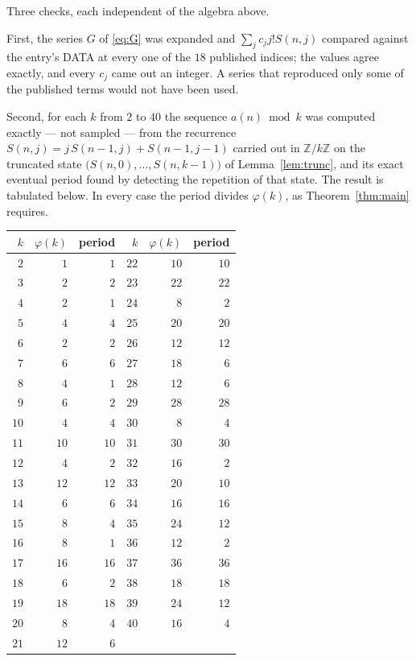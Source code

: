 \documentclass[11pt,a4paper]{article}
\theoremstyle{plain}
\theoremstyle{definition}
\begin{document}
Three checks, each independent of the algebra above.

First, the series $G$ of \eqref{eq:G} was expanded and $\sum_j c_j j! S(n,j)$ compared
against the entry's DATA at every one of the $18$ published indices; the values
agree exactly, and every $c_j$ came out an integer. A series that reproduced only some of
the published terms would not have been used.

Second, for each $k$ from $2$ to $40$ the sequence $a(n)\bmod k$ was computed exactly
--- not sampled --- from the recurrence $S(n,j)=j\,S(n-1,j)+S(n-1,j-1)$ carried out in
$\mathbb{Z}/k\mathbb{Z}$ on the truncated state
$\bigl(S(n,0),\dots,S(n,k-1)\bigr)$ of Lemma~\ref{lem:trunc}, and its exact eventual
period found by detecting the repetition of that state. The result is tabulated below.
In every case the period divides $\varphi(k)$, as Theorem~\ref{thm:main} requires.

\begin{center}\small
\begin{tabular}{rrr@{\qquad\qquad}rrr}
$k$ & $\varphi(k)$ & period & $k$ & $\varphi(k)$ & period \\ \hline
$2$ & $1$ & $1$ & $22$ & $10$ & $10$ \\
$3$ & $2$ & $2$ & $23$ & $22$ & $22$ \\
$4$ & $2$ & $1$ & $24$ & $8$ & $2$ \\
$5$ & $4$ & $4$ & $25$ & $20$ & $20$ \\
$6$ & $2$ & $2$ & $26$ & $12$ & $12$ \\
$7$ & $6$ & $6$ & $27$ & $18$ & $6$ \\
$8$ & $4$ & $1$ & $28$ & $12$ & $6$ \\
$9$ & $6$ & $2$ & $29$ & $28$ & $28$ \\
$10$ & $4$ & $4$ & $30$ & $8$ & $4$ \\
$11$ & $10$ & $10$ & $31$ & $30$ & $30$ \\
$12$ & $4$ & $2$ & $32$ & $16$ & $2$ \\
$13$ & $12$ & $12$ & $33$ & $20$ & $10$ \\
$14$ & $6$ & $6$ & $34$ & $16$ & $16$ \\
$15$ & $8$ & $4$ & $35$ & $24$ & $12$ \\
$16$ & $8$ & $1$ & $36$ & $12$ & $2$ \\
$17$ & $16$ & $16$ & $37$ & $36$ & $36$ \\
$18$ & $6$ & $2$ & $38$ & $18$ & $18$ \\
$19$ & $18$ & $18$ & $39$ & $24$ & $12$ \\
$20$ & $8$ & $4$ & $40$ & $16$ & $4$ \\
$21$ & $12$ & $6$ &  & & \\
\end{tabular}
\end{center}
\end{document}
